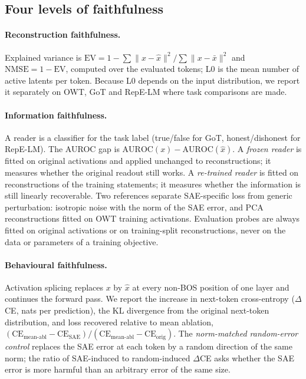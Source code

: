 \subsection{Four levels of faithfulness}\label{sec:levels}

\paragraph{Reconstruction faithfulness.} Explained variance is
$\mathrm{EV}=1-\sum\|x-\hat{x}\|^2/\sum\|x-\bar{x}\|^2$ and $\mathrm{NMSE}=1-\mathrm{EV}$, computed over the
evaluated tokens; L0 is the mean number of active latents per token. Because L0 depends on the input distribution, we
report it separately on OWT, GoT and RepE-LM where task comparisons are made.

\paragraph{Information faithfulness.} A reader is a classifier for the task label (true/false for GoT,
honest/dishonest for RepE-LM). The AUROC gap is $\mathrm{AUROC}(x)-\mathrm{AUROC}(\hat{x})$. A \emph{frozen reader} is
fitted on original activations and applied unchanged to reconstructions; it measures whether the original readout
still works. A \emph{re-trained reader} is fitted on reconstructions of the training statements; it measures whether
the information is still linearly recoverable. Two references separate SAE-specific loss from generic
perturbation: isotropic noise with the norm of the SAE error, and PCA reconstructions fitted on OWT training
activations. Evaluation probes are always fitted on original activations or on training-split reconstructions, never
on the data or parameters of a training objective.

\paragraph{Behavioural faithfulness.} Activation splicing replaces $x$ by $\hat{x}$ at every non-BOS position of one
layer and continues the forward pass. We report the increase in next-token cross-entropy ($\Delta$CE, nats per
prediction), the KL divergence from the original next-token distribution, and loss recovered relative to mean ablation,
$(\mathrm{CE}_{\text{mean-abl}}-\mathrm{CE}_{\text{SAE}})/(\mathrm{CE}_{\text{mean-abl}}-\mathrm{CE}_{\text{orig}})$. The
\emph{norm-matched random-error control} replaces the SAE error at each token by a random direction of the same norm;
the ratio of SAE-induced to random-induced $\Delta$CE asks whether the SAE error is more harmful than an arbitrary error
of the same size.

